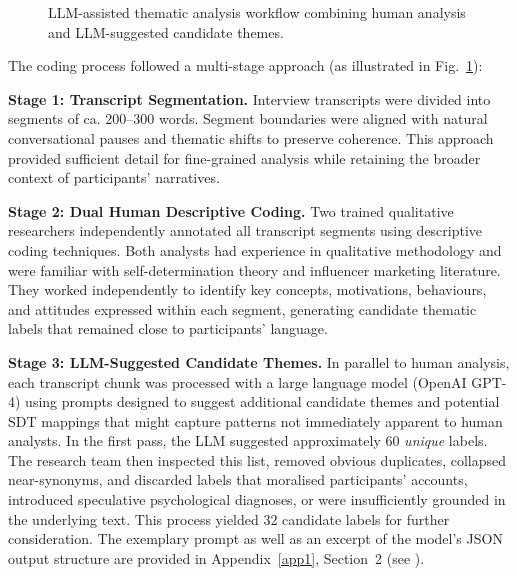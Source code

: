 \begin{figure}[!t]
  \centering

  \caption{LLM-assisted thematic analysis workflow combining human analysis and LLM-suggested candidate themes.}
  \label{fig:ai-coding-flow}
\end{figure}

The coding process followed a multi-stage approach (as illustrated in Fig.~\ref{fig:ai-coding-flow}):

\textbf{Stage 1: Transcript Segmentation.} Interview transcripts were divided into segments of ca. 200--300 words. Segment boundaries were aligned with natural conversational pauses and thematic shifts to preserve coherence. This approach provided sufficient detail for fine-grained analysis while retaining the broader context of participants' narratives.

\textbf{Stage 2: Dual Human Descriptive Coding.} Two trained qualitative researchers independently annotated all transcript segments using descriptive coding techniques. Both analysts had experience in qualitative methodology and were familiar with self-determination theory and influencer marketing literature. They worked independently to identify key concepts, motivations, behaviours, and attitudes expressed within each segment, generating candidate thematic labels that remained close to participants' language.

\textbf{Stage 3: LLM-Suggested Candidate Themes.} In parallel to human analysis, each transcript chunk was processed with a large language model (OpenAI GPT-4) using prompts designed to suggest additional candidate themes and potential SDT mappings that might capture patterns not immediately apparent to human analysts. In the first pass, the LLM suggested approximately 60 \emph{unique} labels. The research team then inspected this list, removed obvious duplicates, collapsed near-synonyms, and discarded labels that moralised participants' accounts, introduced speculative psychological diagnoses, or were insufficiently grounded in the underlying text. This process yielded 32 candidate labels for further consideration. The exemplary prompt as well as an excerpt of the model's JSON output structure are provided in Appendix~\ref{app1}, Section~2 (see ).

